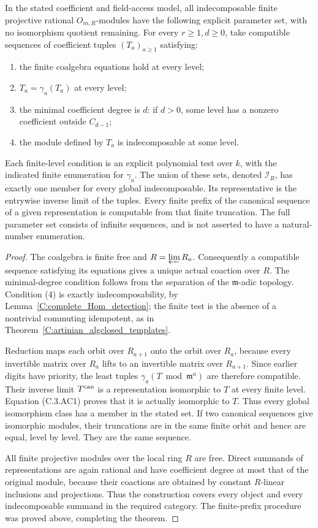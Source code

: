 \begin{theorem}
\label{C:complete_algclosed_indices}
In the stated coefficient and field-access model, all
indecomposable finite projective rational $O_{m,R}$-modules have
the following explicit parameter set, with no isomorphism
quotient remaining.  For every $r\geq1,d\geq0$, take compatible
sequences of coefficient tuples $(T_a)_{a\geq1}$ satisfying:
\begin{enumerate}
\item the finite coalgebra equations hold at every level;
\item $T_a=\gamma_a(T_a)$ at every level;
\item the minimal coefficient degree is $d$: if $d>0$, some
      level has a nonzero coefficient outside $C_{d-1}$;
\item the module defined by $T_a$ is indecomposable at some level.
\end{enumerate}
Each finite-level condition is an explicit polynomial test over
$k$, with the indicated finite enumeration for $\gamma_a$.
The union of these sets, denoted $\mathscr I_R$, has exactly
one member for every global indecomposable.  Its representative
is the entrywise inverse limit of the tuples.
Every finite prefix of the canonical sequence of a given
representation is computable from that finite truncation.
The full parameter set consists of infinite sequences, and is
not asserted to have a natural-number enumeration.
\end{theorem}
\begin{proof}
The coalgebra is finite free and $R=\varprojlim R_a$.
Consequently a compatible sequence satisfying its equations
gives a unique actual coaction over $R$.  The minimal-degree
condition follows from the separation of the $\mathfrak m$-adic
topology.  Condition (4) is exactly indecomposability, by
Lemma~\ref{C:complete_Hom_detection}; the finite test is the
absence of a nontrivial commuting idempotent, as in
Theorem~\ref{C:artinian_algclosed_templates}.

Reduction maps each orbit over $R_{a+1}$ onto the orbit over
$R_a$, because every invertible matrix over $R_a$ lifts to an
invertible matrix over $R_{a+1}$.  Since earlier digits have
priority, the least tuples $\gamma_a(T\bmod\mathfrak m^a)$
are therefore compatible.  Their inverse limit $T^{\rm can}$
is a representation isomorphic to $T$ at every finite level.
Equation (C.3.AC1) proves that it is actually isomorphic to $T$.
Thus every global isomorphism class has a member in the stated
set.  If two canonical sequences give isomorphic modules,
their truncations are in the same finite orbit and hence are
equal, level by level.  They are the same sequence.

All finite projective modules over the local ring $R$ are
free.  Direct summands of representations are again rational
and have coefficient degree at most that of the original
module, because their coactions are obtained by constant
$R$-linear inclusions and projections.  Thus the construction
covers every object and every indecomposable summand in the
required category.  The finite-prefix procedure was proved
above, completing the theorem.
\end{proof}

